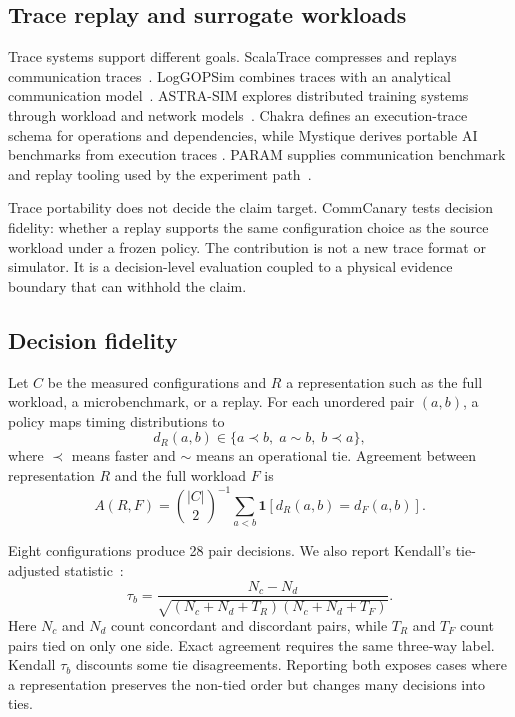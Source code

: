 \documentclass[10pt,twocolumn]{article}
\begin{document}
\subsection{Trace replay and surrogate workloads}

Trace systems support different goals. ScalaTrace compresses and replays
communication traces~\cite{scalatrace}. LogGOPSim combines traces with an
analytical communication model~\cite{loggopsim}. ASTRA-SIM explores distributed
training systems through workload and network models~\cite{astrasim,astrasim2}.
Chakra defines an execution-trace schema for operations and dependencies,
while Mystique derives portable AI benchmarks from execution traces
\cite{chakra,mystique}. PARAM supplies communication benchmark and replay
tooling used by the experiment path~\cite{param}.

Trace portability does not decide the claim target. CommCanary tests decision
fidelity: whether a replay supports the same configuration choice as the source
workload under a frozen policy. The contribution is not a new trace format or
simulator. It is a decision-level evaluation coupled to a physical evidence
boundary that can withhold the claim.

\subsection{Decision fidelity}

Let $C$ be the measured configurations and $R$ a representation such as the
full workload, a microbenchmark, or a replay. For each unordered pair $(a,b)$,
a policy maps timing distributions to
\begin{equation}
  d_R(a,b) \in \{a \prec b,\; a \sim b,\; b \prec a\},
\end{equation}
where $\prec$ means faster and $\sim$ means an operational tie. Agreement
between representation $R$ and the full workload $F$ is
\begin{equation}
  A(R,F)=\binom{|C|}{2}^{-1}\sum_{a<b}
  \mathbf{1}[d_R(a,b)=d_F(a,b)].
\end{equation}

Eight configurations produce 28 pair decisions. We also report Kendall's
tie-adjusted statistic~\cite{kendall}:
\begin{equation}
  \tau_b=\frac{N_c-N_d}
  {\sqrt{(N_c+N_d+T_R)(N_c+N_d+T_F)}}.
\end{equation}
Here $N_c$ and $N_d$ count concordant and discordant pairs, while $T_R$ and
$T_F$ count pairs tied on only one side. Exact agreement requires the same
three-way label. Kendall $\tau_b$ discounts some tie disagreements. Reporting
both exposes cases where a representation preserves the non-tied order but
changes many decisions into ties.
\end{document}
